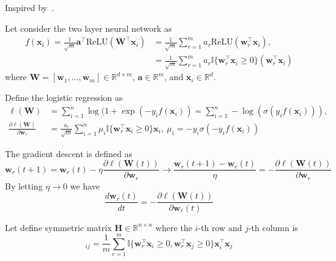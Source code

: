 Inspired by~\cite{arora2019fine}.

Let consider the two layer neural network as
\begin{equation}
    \begin{aligned}
    f(\mathbf{x}_i) = \frac{1}{\sqrt{m}} \mathbf{a}^\top \text{ReLU}(\mathbf{W}^\top \mathbf{x}_i) 
    &= \frac{1}{\sqrt{m}} \sum_{r=1}^m a_r \text{ReLU}(\mathbf{w}_r^\top \mathbf{x}_i), \\
    &=\frac{1}{\sqrt{m}} \sum_{r=1}^m a_r \mathbb{I}\{\mathbf{w}_r^\top \mathbf{x}_i \geq 0\}(\mathbf{w}_r^\top \mathbf{x}_i)
    \end{aligned}
\end{equation}
where $\mathbf{W} = [\mathbf{w}_1,\ldots,\mathbf{w}_m] \in \mathbb{R}^{d\times m}$, $\mathbf{a} \in \mathbb{R}^m$, and $\mathbf{x}_i \in \mathbb{R}^d$.


Define the logistic regression as
\begin{equation}
    \begin{aligned}
    \ell(\mathbf{W}) &= \sum_{i=1}^n \log(1 + \exp( - y_i f(\mathbf{x}_i)) = \sum_{i=1}^n -\log(\sigma(y_i f(\mathbf{x}_i))) , \\
    \frac{\partial \ell(\mathbf{W})}{\partial \mathbf{w}_r} &= \frac{a_r}{\sqrt{m}}\sum_{i=1}^n \mu_i \mathbb{I}\{\mathbf{w}_r^\top \mathbf{x}_i \geq 0\} \mathbf{x}_i,~\mu_i = - y_i \sigma(-y_i f(\mathbf{x}_i))
    \end{aligned}
\end{equation}


The gradient descent is defined as
\begin{equation}
    \mathbf{w}_r(t+1) =  \mathbf{w}_r(t) - \eta \frac{\partial \ell(\mathbf{W}(t))}{\partial \mathbf{w}_r} \rightarrow \frac{\mathbf{w}_r(t+1) -  \mathbf{w}_r(t)}{\eta } = - \frac{\partial \ell(\mathbf{W}(t))}{\partial \mathbf{w}_r}
\end{equation}
By letting $\eta \rightarrow 0$ we have
\begin{equation}
    \frac{d\mathbf{w}_r(t)}{dt} = - \frac{\partial \ell(\mathbf{W}(t))}{\partial \mathbf{w}_r(t)}
\end{equation}

Let define symmetric matrix $\mathbf{H} \in \mathbb{R}^{n\times n}$ where the $i$-th row and $j$-th column is
\begin{equation}
    [\mathbf{H}]_{ij} = \frac{1}{m} \sum_{r=1}^m \mathbb{I}\{\mathbf{w}_r^\top \mathbf{x}_i \geq 0, \mathbf{w}_r^\top \mathbf{x}_j \geq 0\} \mathbf{x}_i^\top \mathbf{x}_j
\end{equation}

